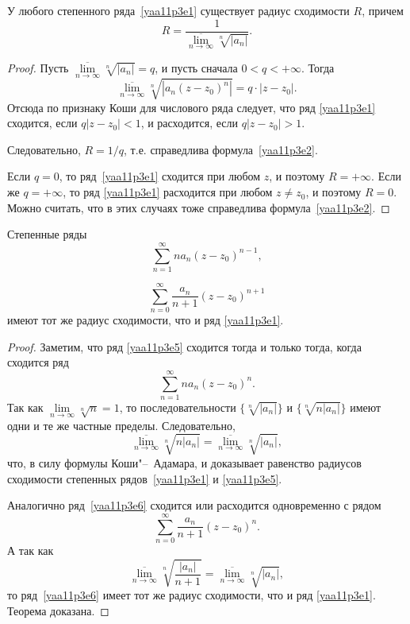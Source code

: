 \begin{thm} 
У любого степенного ряда~\eqref{yaa11p3e1} существует радиус сходимости $R$, причем
\begin{equation}\label{yaa11p3e2}
R=\frac{1}{\overline{\lim\limits_{n\to\infty}}\sqrt[n]{|a_n|}}.
\end{equation} 
\end{thm}

\begin{proof}
Пусть $\overline{\lim\limits_{n\to\infty}}\sqrt[n]{|a_n|}=q$, и пусть сначала $0<q<+\infty$. Тогда
$$
\overline{\lim\limits_{n\to\infty}}\sqrt[n]{|a_n(z-z_0)^n|}=q\cdot |z-z_0|.
$$
Отсюда по признаку Коши для числового ряда следует, что ряд \eqref{yaa11p3e1} сходится, если $q|z-z_0|<1$, и расходится, если $q|z-z_0|>1$.

Следовательно, $R=1/q$, т.е. справедлива формула~\eqref{yaa11p3e2}.

Если $q=0$, то ряд~\eqref{yaa11p3e1} сходится при любом $z$, и поэтому $R=+\infty$. Если же $q=+\infty$, то ряд \eqref{yaa11p3e1} расходится при любом $z\ne z_0$, и поэтому $R=0$. Можно считать, что в этих случаях тоже справедлива формула~\eqref{yaa11p3e2}. 
\end{proof}

\begin{thm} \label{yaa11p3thm3}
Степенные ряды
\begin{equation}\label{yaa11p3e5}
\sum\limits_{n=1}^{\infty} na_n(z-z_0)^{n-1},
\end{equation}

\begin{equation}\label{yaa11p3e6}
\sum\limits_{n=0}^{\infty}\frac{a_n}{n+1}(z-z_0)^{n+1}
\end{equation}
имеют тот же радиус сходимости, что и ряд \eqref{yaa11p3e1}.
\end{thm}

\begin{proof}
Заметим, что ряд \eqref{yaa11p3e5} сходится тогда и только тогда, когда сходится ряд
$$
\sum\limits_{n=1}^{\infty}na_n(z-z_0)^n.
$$
Так как $\lim\limits_{n\to\infty} \sqrt[n]{n} = 1$, то последовательности $\{\sqrt[n]{|a_n|}\}$ и $\{\sqrt[n]{n|a_n|}\}$ имеют одни и те же частные пределы. Следовательно,
$$
\overline{\lim\limits_{n\to\infty}}\sqrt[n]{n|a_n|}=\overline{\lim\limits_{n\to\infty}}\sqrt[n]{|a_n|},
$$
что, в силу формулы Коши"--~Адамара, и доказывает равенство радиусов сходимости степенных рядов~\eqref{yaa11p3e1} и \eqref{yaa11p3e5}.

Аналогично ряд~\eqref{yaa11p3e6} сходится или расходится одновременно с рядом
$$
\sum\limits_{n=0}^{\infty}\frac{a_n}{n+1}(z-z_0)^n.
$$
А так как 
$$
\overline{\lim\limits_{n\to\infty}}\sqrt[n]{\frac{|a_n|}{n+1}}=\overline{\lim\limits_{n\to\infty}}\sqrt[n]{|a_n|},
$$
то ряд~\eqref{yaa11p3e6} имеет тот же радиус сходимости, что и ряд \eqref{yaa11p3e1}. Теорема доказана.
\end{proof}

